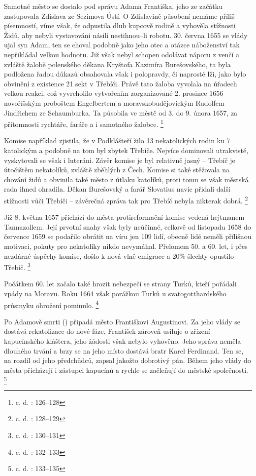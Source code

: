 \documentclass[a4paper,oneside,12p]{report}
\begin{document}
Samotné město se dostalo pod správu Adama Františka, jeho ze začátku zastupovala Zdislava ze Sezimova Ústí.
O Zdislavině působení nemáme příliš písemností, víme však, že odpustila dluh kupcově rodině a vyhověla stížnosti Židů, aby nebyli vystavováni násilí nestihnou--li robotu.
30. června 1655 se vlády ujal syn Adam, ten se choval podobně jako jeho otec a otázce náboženství tak nepřikládal velkou hodnotu.
Již však nebyl schopen odolávat náporu z venčí a zvláště žalobě polenského děkana Kryštofa Kazimíra Burešovského, ta byla podložena řadou důkazů obsahovala však i polopravdy, či naprosté lži, jako bylo obvinění z existence 21 sekt v Třebíči.
Právě tato žaloba vyvolala na úřadech velkou reakci, což vyvrcholilo vytvořením  zorganizované 2. prosince 1656 novoříšským proboštem Engelbertem a moravskobudějovickým Rudolfem Jindřichem ze Schaumburka.
Ta působila ve městě od 3. do 9. února 1657, za přítomnosti rychtáře, faráře a i samotného žalobce. \footnote{c. d. : 126--128}

Komise například zjistila, že v Podklášteří žilo 13 nekatolických rodin ku 7 katolickým a podobně na tom byl zbytek Třebíče.
Nejvíce dominovali utrakvisté, vyskytovali se však i luteráni.
Závěr komise je byl relativně jasný -- Třebíč je útočištěm nekatolíků, zvláště zběhlých z Čech.
Komise si také stěžovala na chování židů a obvinila také město z útlaku katolíků, proti tomu se však městská rada ihned ohradila.
Děkan Burešovský a farář Slovatius navíc přidali další stížnosti vůči Třebíči -- závěrečná zpráva tak pro Třebíč nebyla nikterak dobrá.  \footnote{c. d. : 128--129}

Již 8. května 1657 přichází do města protireformační komise vedená hejtmanem Tannazollem.
Její prvotní snahy však byly neúčinné, celkově od listopadu 1658 do července 1659 se podařilo obrátit na  víru jen 109 lidí, obecně lidé neměli přílišnou motivaci, pokuty pro nekatolíky nikdo nevymáhal.
Přelomem 50. a 60. let, i přes nezdárné úspěchy komise, došlo k nová vlně emigrace a 20\% šlechty opustilo Třebíč. \footnote{c. d. : 130--131}

Počátkem 60. let začalo také hrozit nebezpečí se strany Turků, kteří pořádali vpády na Moravu.
Roku 1664 však porážkou Turků u svatogotthardského průsmyku ohrožení pominulo. \footnote{c. d. : 132--133}

Po Adamově smrti () připadá město Františkovi Augustinovi.
Za jeho vlády se dostává rekatolizace do nové fáze, František zároveň usiluje o zřízení kapucínského kláštera, jeho žádosti však nebylo vyhověno.
Jeho správa neměla dlouhého trvání a brzy se na jeho místo dostává bratr Karel Ferdinand.
Ten se, na rozdíl od jeho předchůdců, zapsal jakožto dobrotivý pán.
Během jeho vlády do města přicházejí i zástupci kapucínů a rychle se začleňují do městské společnosti. \footnote{c. d. : 133--135}
\end{document}
